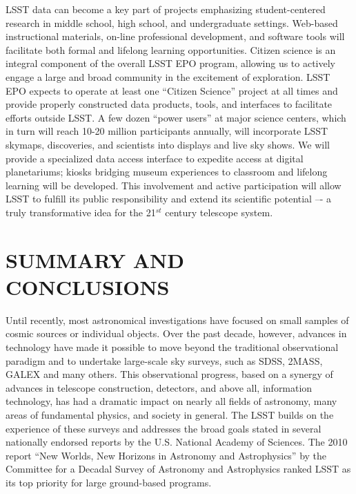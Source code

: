 \documentclass{emulateapj}
\begin{document}
{LSST data can become a key part of projects emphasizing student-centered research in middle school, high 
school, and undergraduate settings. Web-based instructional materials, on-line professional development, and 
software tools will facilitate both formal and lifelong learning opportunities.  Citizen science is an integral 
component of the overall LSST EPO program, allowing us to actively engage a large and broad community in 
the excitement of exploration.  LSST EPO expects to operate at least one ``Citizen Science'' project at all times and provide 
properly constructed data products, tools, and interfaces to facilitate efforts outside LSST.   A few dozen 
``power users'' at major science centers, which in turn will reach 10-20 million participants annually, will incorporate 
LSST skymaps, discoveries,  and scientists into displays and live sky shows.  We will provide a specialized data 
access interface to expedite access at digital planetariums; kiosks bridging museum experiences to classroom 
and lifelong learning will be developed. This 
involvement and active participation will allow LSST to fulfill its public responsibility and extend its scientific 
potential –- a truly transformative idea for the 21$^{st}$ century telescope system.
}



\section{SUMMARY AND CONCLUSIONS} 
\label{Sec:conclusions}

Until recently, most astronomical investigations have focused on small 
samples of cosmic sources or individual objects. Over the past decade, 
however, advances in technology have made it possible to move beyond the 
traditional observational paradigm and to undertake large-scale sky 
surveys, such as SDSS, 2MASS, GALEX and many others. This observational 
progress, based on a synergy of advances in telescope construction, detectors, 
and above all, information technology, has had a dramatic impact on nearly all 
fields of astronomy, many areas of fundamental physics, and society in 
general. The LSST builds on the experience of these surveys and addresses
the broad goals stated in several nationally endorsed reports by the U.S. 
National Academy of Sciences. The 2010 report ``New Worlds, New Horizons 
in Astronomy and Astrophysics'' by the Committee for a Decadal Survey of Astronomy and 
Astrophysics
ranked LSST as its top priority for large ground-based programs.
\end{document}
